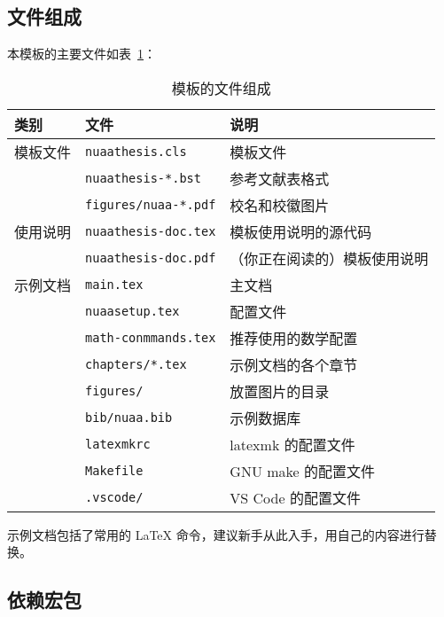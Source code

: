 \documentclass[a4paper]{ltxdoc}
\DeclareRobustCommand\file{\nolinkurl}
\begin{document}
\subsection{文件组成}
本模板的主要文件如表~\ref{tab:files}：
\begin{table}[htb]
    \centering\small
    \caption{模板的文件组成}
    \label{tab:files}
    \begin{tabular}{lll}
        \toprule
        类别     & 文件                      & 说明                         \\
        \midrule
        模板文件 & \file{nuaathesis.cls}     & 模板文件                     \\
                 & \file{nuaathesis-*.bst}   & 参考文献表格式               \\
                 & \file{figures/nuaa-*.pdf} & 校名和校徽图片               \\
        \midrule
        使用说明 & \file{nuaathesis-doc.tex} & 模板使用说明的源代码         \\
                 & \file{nuaathesis-doc.pdf} & （你正在阅读的）模板使用说明 \\
        \midrule
        示例文档 & \file{main.tex}           & 主文档                       \\
                 & \file{nuaasetup.tex}      & 配置文件                     \\
                 & \file{math-conmmands.tex} & 推荐使用的数学配置           \\
                 & \file{chapters/*.tex}     & 示例文档的各个章节           \\
                 & \file{figures/}           & 放置图片的目录               \\
                 & \file{bib/nuaa.bib}       & \BibTeX{} 示例数据库         \\
        \midrule
                 & \file{latexmkrc}          & latexmk 的配置文件           \\
                 & \file{Makefile}           & GNU make 的配置文件          \\
                 & \file{.vscode/}           & VS Code 的配置文件           \\
        \bottomrule
    \end{tabular}
\end{table}

示例文档包括了常用的 \LaTeX{} 命令，建议新手从此入手，用自己的内容进行替换。


\subsection{依赖宏包}
\end{document}
